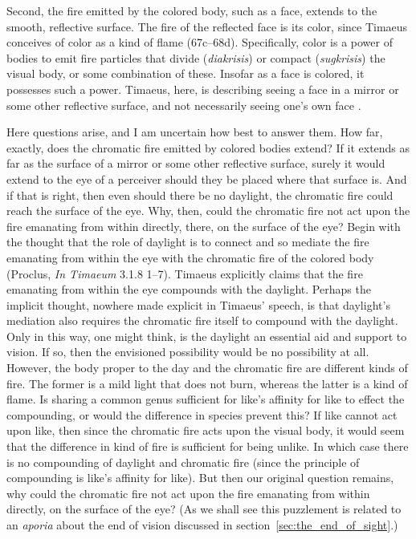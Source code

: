 Second, the fire emitted by the colored body, such as a face, extends to the smooth, reflective surface. The fire of the reflected face is its color, since Timaeus conceives of color as a kind of flame (67c–68d). Specifically, color is a power of bodies to emit fire particles that divide (\emph{diakrisis}) or compact (\emph{sugkrisis}) the visual body, or some combination of these. Insofar as a face is colored, it possesses such a power. Timaeus, here, is describing seeing a face in a mirror or some other reflective surface, and not necessarily seeing one's own face \citep[286--7]{Taylor:1928qb}. 

Here questions arise, and I am uncertain how best to answer them. How far, exactly, does the chromatic fire emitted by colored bodies extend? If it extends as far as the surface of a mirror or some other reflective surface, surely it would extend to the eye of a perceiver should they be placed where that surface is. And if that is right, then even should there be no daylight, the chromatic fire could reach the surface of the eye. Why, then, could the chromatic fire not act upon the fire emanating from within directly, there, on the surface of the eye? Begin with the thought that the role of daylight is to connect and so mediate the fire emanating from within the eye with the chromatic fire of the colored body (Proclus, \emph{In Timaeum} 3.1.8 1--7). Timaeus explicitly claims that the fire emanating from within the eye compounds with the daylight. Perhaps the implicit thought, nowhere made explicit in Timaeus' speech, is that daylight's mediation also requires the chromatic fire itself to compound with the daylight. Only in this way, one might think, is the daylight an essential aid and support to vision. If so, then the envisioned possibility would be no possibility at all. However, the body proper to the day and the chromatic fire are different kinds of fire. The former is a mild light that does not burn, whereas the latter is a kind of flame. Is sharing a common genus sufficient for like's affinity for like to effect the compounding, or would the difference in species prevent this? If like cannot act upon like, then since the chromatic fire acts upon the visual body, it would seem that the difference in kind of fire is sufficient for being unlike. In which case there is no compounding of daylight and chromatic fire (since the principle of compounding is like's affinity for like). But then our original question remains, why could the chromatic fire not act upon the fire emanating from within directly, on the surface of the eye? (As we shall see this puzzlement is related to an \emph{aporia} about the end of vision discussed in section~\ref{sec:the_end_of_sight}.)


